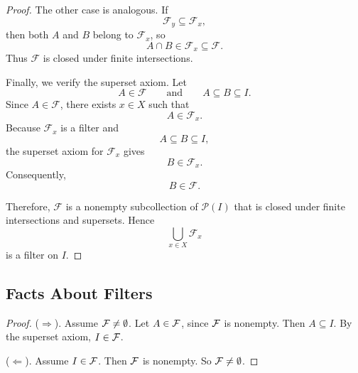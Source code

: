 {\begin{proof}
The other case is analogous. If
\[
\mathcal{F}_y\subseteq\mathcal{F}_x,
\]
then both \(A\) and \(B\) belong to \(\mathcal{F}_x\), so
\[
A\cap B\in\mathcal{F}_x\subseteq\mathcal{F}.
\]
Thus \(\mathcal{F}\) is closed under finite intersections.

Finally, we verify the superset axiom. Let
\[
A\in\mathcal{F}
\qquad\text{and}\qquad
A\subseteq B\subseteq I.
\]
Since \(A\in\mathcal{F}\), there exists \(x\in X\) such that
\[
A\in\mathcal{F}_x.
\]
Because \(\mathcal{F}_x\) is a filter and
\[
A\subseteq B\subseteq I,
\]
the superset axiom for \(\mathcal{F}_x\) gives
\[
B\in\mathcal{F}_x.
\]
Consequently,
\[
B\in\mathcal{F}.
\]

Therefore, \(\mathcal{F}\) is a nonempty subcollection of
\(\mathcal{P}(I)\) that is closed under finite intersections and supersets.
Hence
\[
\bigcup_{x\in X}\mathcal{F}_x
\]
is a filter on \(I\).
\end{proof}

\subsection{Facts About Filters}
\begin{proof}
    ($\Rightarrow$). Assume $\mathcal{F} \neq \emptyset$. Let $A \in \mathcal{F}$, since $\mathcal{F}$ is nonempty. Then $A \subseteq I$. By the superset axiom, $I \in \mathcal{F}$.

    \noin ($\Leftarrow$). Assume $I \in \mathcal{F}$. Then $\mathcal{F}$ is nonempty. So $\mathcal{F} \neq \emptyset$.
\end{proof}

}
